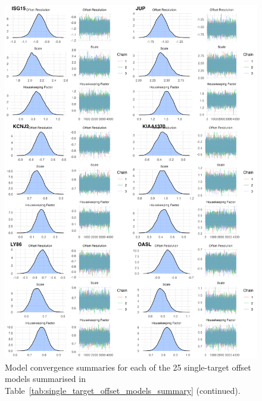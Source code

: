 \documentclass[../thesis.tex]{subfiles}
\begin{document}
\begin{figure}
    \centering
    \includegraphics[width=\textwidth]{figures/chapter2/model_summaries_3.png}
    \caption{Model convergence summaries for each of the 25 single-target offset models summarised in Table~\ref{tab:single_target_offset_models_summary} (continued).}
    \label{fig:convergence_3}
\end{figure}
\end{document}
